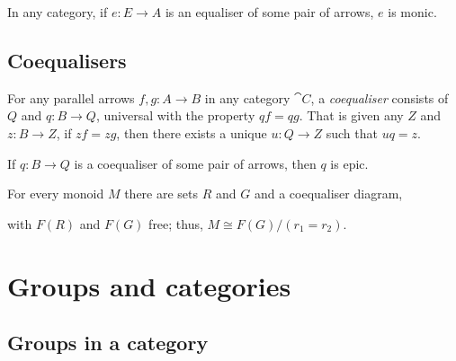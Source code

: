 \documentclass{article}
\begin{document}
\begin{proposition}[Awodey 3.16]
    In any category, if $e:E\to A$ is an equaliser of some pair of arrows, $e$ is monic.
\end{proposition}

\subsection{Coequalisers}

\begin{definition}
    For any parallel arrows $f,g:A\to B$ in any category $\cat C$, a \emph{coequaliser}
    consists of $Q$ and $q:B\to Q$, universal with the property $qf=qg$. That is given
    any $Z$ and $z:B\to Z$, if $zf=zg$, then there exists a unique $u:Q\to Z$ such that
    $uq=z$.
\end{definition}

\begin{proposition}[Awodey 3.19]
    If $q:B\to Q$ is a coequaliser of some pair of arrows, then $q$ is epic.
\end{proposition}

\begin{proposition}[Awodey 3.24]
    For every monoid $M$ there are sets $R$ and $G$ and a coequaliser diagram,
    \begin{center}
    \end{center}
    with $F(R)$ and $F(G)$ free; thus, $M\cong F(G)/(r_1=r_2)$.
\end{proposition}

\section{Groups and categories}

\subsection{Groups in a category}
\end{document}
